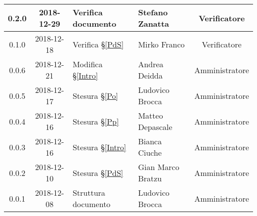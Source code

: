 \begin{center}
\begin{tabularx}{\textwidth}{|c|c|X|X|c|}
			\hline
			0.2.0 & 2018-12-29 & Verifica documento & Stefano Zanatta & Verificatore\\
			\hline
			0.1.0 & 2018-12-18 & Verifica \S\ref{PdS} & Mirko Franco & Verificatore\\
			\hline
			0.0.6 & 2018-12-21 & Modifica \S\ref{Intro} & Andrea Deidda & Amministratore\\
			\hline
			0.0.5 & 2018-12-17 & Stesura \S\ref{Po} & Ludovico Brocca & Amministratore\\
			\hline
			0.0.4 & 2018-12-16 & Stesura \S\ref{Pp} & Matteo Depascale & Amministratore\\
			\hline
			0.0.3 & 2018-12-16 & Stesura \S\ref{Intro} & Bianca Ciuche & Amministratore\\
			\hline
			0.0.2 & 2018-12-10 & Stesura \S\ref{PdS} & Gian Marco Bratzu & Amministratore\\	
			\hline
			0.0.1 & 2018-12-08 & Struttura documento  & Ludovico Brocca & Amministratore\\
			\hline
	\end{tabularx}
	\end{center}

\newpage
